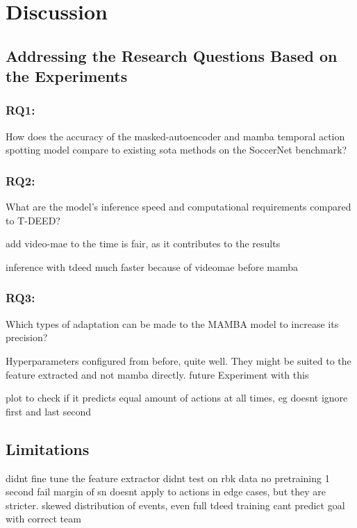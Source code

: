 \chapter{Discussion}
\label{chap:discussion}

\section{Addressing the Research Questions Based on the Experiments}


\subsection{RQ1:} 
How does the accuracy of the masked-autoencoder and mamba temporal action spotting model compare to existing \acrlong{sota} methods on the SoccerNet benchmark?
\subsection{RQ2:} 
What are the model’s inference speed and computational requirements compared to T-DEED?

add video-mae to the time is fair, as it contributes to the results

inference with tdeed much faster because of videomae before mamba


\subsection{RQ3:}
Which types of adaptation can be made to the MAMBA model to increase its precision?

Hyperparameters configured from before, quite well. 
They might be suited to the feature extracted and not mamba directly. 
future Experiment with this


plot to check if it predicts equal amount of actions at all times, eg doesnt ignore first and last second 

\section{Limitations}
didnt fine tune the feature extractor
didnt test on rbk data
no pretraining
1 second fail margin of sn doesnt apply to actions in edge cases, but they are stricter. 
skewed distribution of events, even full tdeed training cant predict goal with correct team

